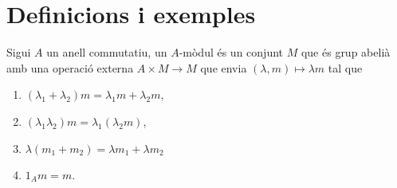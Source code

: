 \documentclass[../../../main.tex]{subfiles}
\begin{document}
\section{Definicions i exemples}

\begin{defi}
[Mòdul]\label{def:modul} Sigui $A$ un anell commutatiu, un $A$-mòdul és un conjunt $M$ que és grup abelià amb una operació externa $A\times M\to M$ que envia $(\lambda,m)\mapsto \lambda m$ tal que
\begin{enumerate}[(1)]
    \item $(\lambda_1+\lambda_2)m = \lambda_1m+\lambda_2m$,
    \item $(\lambda_1\lambda_2)m = \lambda_1(\lambda_2m)$,
    \item $\lambda(m_1+m_2)=\lambda m_1+\lambda m_2$
    \item $1_Am = m$.
\end{enumerate}
\end{defi}
\end{document}
